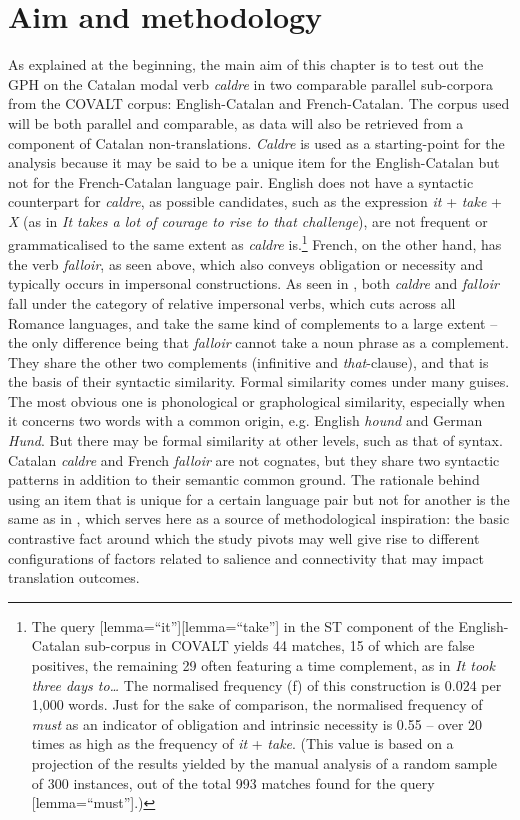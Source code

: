 \documentclass[output=paper,english,spanish,german,english]{langsci/langscibook}
\begin{document}
\section{Aim and methodology}\label{meth}

As explained at the beginning, the main aim of this chapter is to test out the GPH on the Catalan modal verb \textit{caldre} in two comparable parallel sub-corpora from the COVALT corpus: English-Catalan and French-Catalan. The corpus used will be both parallel and comparable, as data will also be retrieved from a component of Catalan non-translations. \textit{Caldre} is used as a starting-point for the analysis because it may be said to be a unique item for the English-Catalan but not for the French-Catalan language pair. English does not have a syntactic counterpart for \textit{caldre}, as possible candidates, such as the expression \textit{it} + \textit{take} + \textit{X} (as in \textit{It takes a lot of courage to rise to that challenge}), are not frequent or grammaticalised to the same extent as \textit{caldre} is.\footnote{The query [lemma=\enquote{it}][lemma=\enquote{take}] in the ST component of the English-Catalan sub-corpus in COVALT yields 44 matches, 15 of which are false positives, the remaining 29 often featuring a time complement, as in \textit{It took three days to\dots} The normalised frequency (f) of this construction is 0.024 per 1,000 words. Just for the sake of comparison, the normalised frequency of \textit{must} as an indicator of obligation and intrinsic necessity is 0.55 -- over 20 times as high as the frequency of \textit{it} + \textit{take}. (This value is based on a projection of the results yielded by the manual analysis of a random sample of 300 instances, out of the total 993 matches found for the query [lemma=\enquote{must}].)} French, on the other hand, has the verb \textit{falloir}, as seen above, which also conveys obligation or necessity and typically occurs in impersonal constructions. As seen in , both \textit{caldre} and \textit{falloir} fall under the category of relative impersonal verbs, which cuts across all Romance languages, and take the same kind of complements to a large extent – the only difference being that \textit{falloir} cannot take a noun phrase as a complement. They share the other two complements (infinitive and \textit{that}-clause), and that is the basis of their syntactic similarity. Formal similarity comes under many guises. The most obvious one is phonological or graphological similarity, especially when it concerns two words with a common origin, e.g. English \textit{hound} and German \textit{Hund}. But there may be formal similarity at other levels, such as that of syntax. Catalan \textit{caldre} and French \textit{falloir} are not cognates, but they share two syntactic patterns in addition to their semantic common ground. The rationale behind using an item that is unique for a certain language pair but not for another is the same as in \citet{hareide17}, which serves here as a source of methodological inspiration: the basic contrastive fact around which the study pivots may well give rise to different configurations of factors related to salience and connectivity that may impact translation outcomes.
\end{document}

